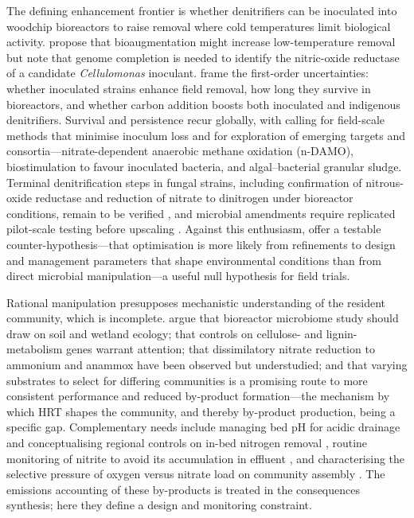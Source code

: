 \documentclass[11pt]{article}
\begin{document}
The defining enhancement frontier is whether denitrifiers can be inoculated into
woodchip bioreactors to raise removal where cold temperatures limit biological
activity. \textcite{Jang2019} propose that bioaugmentation might increase
low-temperature removal but note that genome completion is needed to identify the
nitric-oxide reductase of a candidate \emph{Cellulomonas} inoculant.
\textcite{Anderson2020} frame the first-order uncertainties: whether inoculated
strains enhance field removal, how long they survive in bioreactors, and whether
carbon addition boosts both inoculated and indigenous denitrifiers. Survival and
persistence recur globally, with \textcite{Wang2025b} calling for field-scale
methods that minimise inoculum loss and for exploration of emerging targets and
consortia---nitrate-dependent anaerobic methane oxidation (n-DAMO), biostimulation
to favour inoculated bacteria, and algal--bacterial granular sludge. Terminal
denitrification steps in fungal strains, including confirmation of nitrous-oxide
reductase and reduction of nitrate to dinitrogen under bioreactor conditions,
remain to be verified \parencite{Aldossari2021}, and microbial amendments require
replicated pilot-scale testing before upscaling
\parencite{Jeglot2022,Ma2021}. Against this enthusiasm,
\textcite{Hathaway2015} offer a testable counter-hypothesis---that optimisation is
more likely from refinements to design and management parameters that shape
environmental conditions than from direct microbial manipulation---a useful null
hypothesis for field trials.

Rational manipulation presupposes mechanistic understanding of the resident
community, which is incomplete. \textcite{Hartfiel2022} argue that bioreactor
microbiome study should draw on soil and wetland ecology; that controls on
cellulose- and lignin-metabolism genes warrant attention; that dissimilatory
nitrate reduction to ammonium and anammox have been observed but understudied;
and that varying substrates to select for differing communities is a promising
route to more consistent performance and reduced by-product formation---the
mechanism by which HRT shapes the community, and thereby by-product production,
being a specific gap. Complementary needs include managing bed pH for acidic
drainage and conceptualising regional controls on in-bed nitrogen removal
\parencite{Bock2018}, routine monitoring of nitrite to avoid its accumulation in
effluent \parencite{Kouanda2021}, and characterising the selective pressure of
oxygen versus nitrate load on community assembly \parencite{Schaefer2021}. The
emissions accounting of these by-products is treated in the consequences
synthesis; here they define a design and monitoring constraint.
\end{document}
